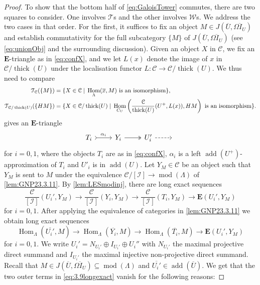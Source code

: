 \documentclass[10pt,twoside, a4paper,reqno]{amsart}
\DeclareMathOperator{\mods}{mod}
\DeclareMathOperator{\Hom}{Hom}
\DeclareMathOperator{\add}{add}
\DeclareMathOperator{\thick}{thick}
\newcommand{\sth}{\;\vert\;}
\newcommand{\calI}{\mathcal{I}}
\newcommand{\calC}{\mathcal{C}}
\newcommand{\calT}{\mathcal{T}}
\newcommand{\calW}{\mathcal{W}}
\newcommand{\E}{\mathbf{E}}
\theoremstyle{definition}
\begin{document}
\begin{proof}
      To show that the bottom half of \eqref{eq:GaloisTower} commutes, there are two squares to consider. One involves $\calT$s and the other involves $\calW$s. We address the two cases in that order. For the first, it suffices to fix an object $M\in J(\overline{U},\overline{\Omega I_U})$ and establish commutativity for the full subcategory {$\{ M\}$} of $J(\overline{U},\overline{\Omega I_U})$ (see \eqref{eq:unionObj} and the surrounding discussion). Given an object $X$ in $\calC$, we fix {an $\E$-triangle} as in \cref{eq:confX}, and we let $L(x)$ denote the image of $x$ in $\calC/\thick(U)$ under the localisation functor $L\colon \calC \xrightarrow{} \calC/\thick(U)$. We {thus need to compare}
      \begin{align*}
      \calT_{\calC}(\{M\}) &= \{X \in \calC \sth \Hom_{\Lambda}(\overline{x},M) \text{ is an isomorphism} \}, \\
      \calT_{\calC/\thick(U)}(\{HM\}) &=  \{X \in \calC/\thick(U) \sth \Hom_{C_U}\left({\calC \over \thick(U)}(U^+, L(x)),HM\right) \text{ is an isomorphism} \}. 
      \end{align*}
        gives {an $\E$-triangle}        
        \begin{equation}\label{eq:3.9exchange'}
      \begin{tikzcd}
      	T_i  \arrow[r,tail,"\alpha_i"] & Y_i  \arrow[r,two heads] & U'_i \arrow[r,dashed] & {}
	\end{tikzcd}
      \end{equation}
         for $i=0,1$, where the objects $T_i$ are as in \eqref{eq:confX}, $\alpha_i$ is a left $\add(U^+)$-approximation {of $T_i$} and $U'_i$ is in $\add(U)$. Let $Y_M \in \calC$ be an object such that $Y_M$ is sent to $M$ under the equivalence $\calC/[\calI] \to \mods (\Lambda)$ of \cref{lem:GNP23.3.11}. By \cref{lem:LESmodinj}, there are long exact sequences
       \[ \frac{\calC}{[\calI]}(U_i', Y_M) \to \frac{\calC}{[\calI]}(Y_i, Y_M) \to \frac{\calC}{[\calI]}(T_i, Y_M) \to \E(U_i', Y_M) \]
       for $i=0,1$. 
       After applying the equivalence of categories in \cref{lem:GNP23.3.11} we obtain long exact sequences
       \begin{equation}\label{eq:3.9longexact} \Hom_{\Lambda}(\overline{U_i'}, M) \to \Hom_{\Lambda}(\overline{Y_i}, M) \to \Hom_{\Lambda}(\overline{T_i}, M) \to \E(U_i', Y_M) \end{equation}
       for $i=0,1$. We write $U_i' = N_{U_i'} \oplus I_{U_i'} \oplus U_i''$ with $N_{U_i'}$ the maximal projective direct summand and $I_{U_i'}$ the maximal injective non-projective direct summand. Recall that $M \in J(\overline{U},\overline{\Omega I_U}) \subseteq \mods(\Lambda)$ and ${\overline{U_i'}} \in \add(\overline{U})$. We get that the two outer terms in \eqref{eq:3.9longexact} vanish for the following reasons:

\end{proof}
\end{document}
